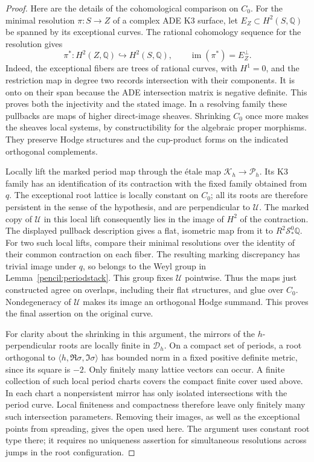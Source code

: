 \documentclass[11pt]{amsart}
\newcommand{\Q}{\mathbb Q}
\DeclareMathOperator{\im}{im}
\theoremstyle{definition}
\theoremstyle{remark}
\numberwithin{equation}{section}
\begin{document}
\begin{proof}
Here are the details of the cohomological comparison on \(C_0\).
For the minimal resolution \(\pi:S\to Z\) of a complex ADE K3
surface, let \(E_Z\subset H^2(S,\Q)\) be spanned by its exceptional
curves.  The rational cohomology sequence for the resolution gives
\[
 \pi^*:H^2(Z,\Q)\hookrightarrow H^2(S,\Q),
 \qquad \im(\pi^*)=E_Z^\perp.
\]
Indeed, the exceptional fibers are trees of rational curves, with
\(H^1=0\), and the restriction map in degree two records intersection
with their components.  It is onto on their span because the ADE
intersection matrix is negative definite.  This proves both the
injectivity and the stated image.  In a resolving family these
pullbacks are maps of higher direct-image sheaves.  Shrinking \(C_0\)
once more makes the sheaves local systems, by constructibility for
the algebraic proper morphisms.  They preserve Hodge structures and
the cup-product forms on the indicated orthogonal complements.

Locally lift the marked period map through the \'etale map
\(\mathscr K_h\to\mathscr P_h\).  Its K3 family has an identification
of its contraction with the fixed family obtained from \(q\).
The exceptional root lattice is locally constant on \(C_0\); all its
roots are therefore persistent in the sense of the hypothesis, and
are perpendicular to \(\mathcal U\).  The marked copy of
\(\mathcal U\) in this local lift consequently lies in the image of
\(H^2\) of the contraction.  The displayed pullback description gives
a flat, isometric map from it to \(R^2\mathcal S^0_*\Q\).
For two such local lifts, compare their minimal resolutions over the
identity of their common contraction on each fiber.  The resulting
marking discrepancy has trivial image under \(q\), so belongs to the
Weyl group in Lemma~\ref{pencil:periodstack}.  This group fixes
\(\mathcal U\) pointwise.  Thus the maps just constructed agree on
overlaps, including their flat structures, and glue over \(C_0\).
Nondegeneracy of \(\mathcal U\) makes its image an orthogonal Hodge
summand.  This proves the final assertion on the original curve.

For clarity about the shrinking in this argument, the mirrors of the
\(h\)-perpendicular roots are locally finite in \(\mathscr D_h\).
On a compact set of periods, a root orthogonal to
\(\langle h,\Re\sigma,\Im\sigma\rangle\) has bounded norm in a
fixed positive definite metric, since its square is \(-2\).
Only finitely many lattice vectors can occur.  A finite collection
of such local period charts covers the compact finite cover used
above.  In each chart a nonpersistent mirror has only isolated
intersections with the period curve.  Local finiteness and compactness
therefore leave only finitely many such intersection parameters.
Removing their images, as well as the exceptional points
from spreading, gives the open used here.  The argument uses constant
root type there; it requires no uniqueness assertion for simultaneous
resolutions across jumps in the root configuration.
\end{proof}
\end{document}
